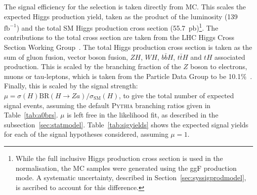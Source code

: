 \documentclass[NOTE, atlasdraft=true, texlive=2017, UKenglish]{\ATLASLATEXPATH atlasdoc}
\begin{document}
The signal efficiency for the selection is taken directly from MC. This scales the expected Higgs production yield, taken as the product of the luminosity (139~$\text{fb}^{-1}$) and the total SM Higgs production cross section (55.7~pb)\footnote{While the full inclusive Higgs production cross section is used in the normalisation, the MC samples were generated using the ggF production mode. A systematic uncertainty, described in Section~\ref{sec:syssigprodmodel}, is ascribed to account for this difference.}. The contributions to the total cross section are taken from the LHC Higgs Cross Section Working Group~\cite{xsecwg}. The total Higgs production cross section is taken as the sum of gluon fusion, vector boson fusion, $ZH$, $WH$, $b\bar bH$, $t\bar tH$ and $tH$ associated production. This is scaled by the branching fraction of the $Z$ boson to electrons, muons or tau-leptons, which is taken from the Particle Data Group to be 10.1\%~\cite{pdgZBRs}. Finally, this is scaled by the signal strength: $\mu = \sigma(H) \text{BR}(H\to Za) / \sigma_\text{SM}(H)$, to give the total number of expected signal events, assuming the default \textsc{Pythia} branching ratios given in Table~\ref{tab:a0brs}. $\mu$ is left free in the likelihood fit, as described in the subsection~\ref{sec:statmodel}. Table~\ref{tab:sigyields} shows the expected signal yields for each of the signal hypotheses considered, assuming $\mu=1$.%
\end{document}
